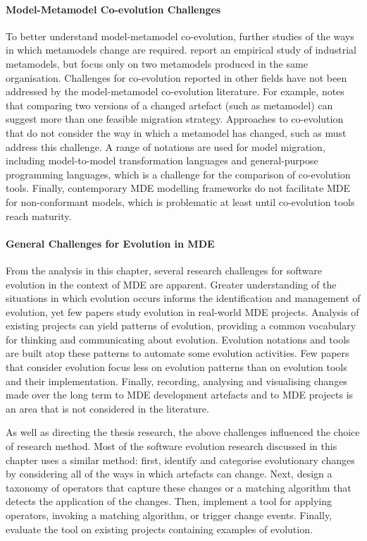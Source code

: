 \paragraph{Model-Metamodel Co-evolution Challenges} To better understand model-metamodel co-evolution, further studies of the ways in which metamodels change are required. \cite{herrmannsdoerfer08automatability} report an empirical study of industrial metamodels, but focus only on two metamodels produced in the same organisation. Challenges for co-evolution reported in other fields have not been addressed by the model-metamodel co-evolution literature. For example, \cite{lerner00model} notes that comparing two versions of a changed artefact (such as metamodel) can suggest more than one feasible migration strategy. Approaches to co-evolution that do not consider the way in which a metamodel has changed, such as \cite{cicchetti08automating,garces09managing} must address this challenge. A range of notations are used for model migration, including model-to-model transformation languages and general-purpose programming languages, which is a challenge for the comparison of co-evolution tools. Finally, contemporary MDE modelling frameworks do not facilitate MDE for non-conformant models, which is problematic at least until co-evolution tools reach maturity.  

\paragraph{General Challenges for Evolution in MDE} From the analysis in this chapter, several research challenges for software evolution in the context of MDE are apparent. Greater understanding of the situations in which evolution occurs informs the identification and management of evolution, yet few papers study evolution in real-world MDE projects. Analysis of existing projects can yield patterns of evolution, providing a common vocabulary for thinking and communicating about evolution. Evolution notations and tools are built atop these patterns to automate some evolution activities. Few papers that consider evolution focus less on evolution patterns than on evolution tools and their implementation. Finally, recording, analysing and visualising changes made over the long term to MDE development artefacts and to MDE projects is an area that is not considered in the literature.

As well as directing the thesis research, the above challenges influenced the choice of research method. Most of the software evolution research discussed in this chapter uses a similar method: first, identify and categorise evolutionary changes by considering all of the ways in which artefacts can change. Next, design a taxonomy of operators that capture these changes or a matching algorithm that detects the application of the changes. Then, implement a tool for applying operators, invoking a matching algorithm, or trigger change events. Finally, evaluate the tool on existing projects containing examples of evolution.

